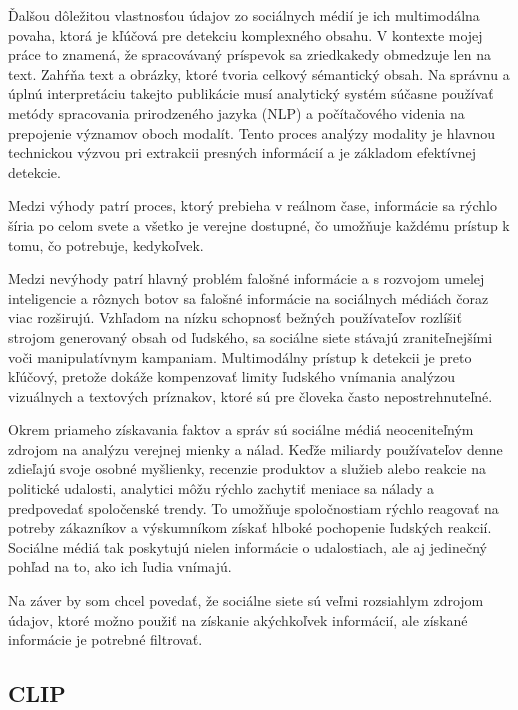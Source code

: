 \documentclass[]{tukediphc}
\begin{document}
Ďalšou dôležitou vlastnosťou údajov zo sociálnych médií je ich multimodálna povaha, ktorá je kľúčová pre detekciu komplexného obsahu. V kontexte mojej práce to znamená, že spracovávaný príspevok sa zriedkakedy obmedzuje len na text. Zahŕňa text a obrázky, ktoré tvoria celkový sémantický obsah. Na správnu a úplnú interpretáciu takejto publikácie musí analytický systém súčasne používať metódy spracovania prirodzeného jazyka (NLP) a počítačového videnia na prepojenie významov oboch modalít. Tento proces analýzy modality je hlavnou technickou výzvou pri extrakcii presných informácií a je základom efektívnej detekcie.

Medzi výhody patrí proces, ktorý prebieha v reálnom čase, informácie sa rýchlo šíria po celom svete a všetko je verejne dostupné, čo umožňuje každému prístup k tomu, čo potrebuje, kedykoľvek.

Medzi nevýhody patrí hlavný problém falošné informácie a s rozvojom umelej inteligencie a rôznych botov sa falošné informácie na sociálnych médiách čoraz viac rozširujú. Vzhľadom na nízku schopnosť bežných používateľov rozlíšiť strojom generovaný obsah od ľudského, sa sociálne siete stávajú zraniteľnejšími voči manipulatívnym kampaniam. Multimodálny prístup k detekcii je preto kľúčový, pretože dokáže kompenzovať limity ľudského vnímania analýzou vizuálnych a textových príznakov, ktoré sú pre človeka často nepostrehnuteľné\cite{Detecting_Artificial_Intelligence_Generated_Text_from_Human-Written_Text}.

Okrem priameho získavania faktov a správ sú sociálne médiá neoceniteľným zdrojom na analýzu verejnej mienky a nálad. Keďže miliardy používateľov denne zdieľajú svoje osobné myšlienky, recenzie produktov a služieb alebo reakcie na politické udalosti, analytici môžu rýchlo zachytiť meniace sa nálady a predpovedať spoločenské trendy. To umožňuje spoločnostiam rýchlo reagovať na potreby zákazníkov a výskumníkom získať hlboké pochopenie ľudských reakcií. Sociálne médiá tak poskytujú nielen informácie o udalostiach, ale aj jedinečný pohľad na to, ako ich ľudia vnímajú.

Na záver by som chcel povedať, že sociálne siete sú veľmi rozsiahlym zdrojom údajov, ktoré možno použiť na získanie akýchkoľvek informácií, ale získané informácie je potrebné filtrovať.


\subsection{CLIP}
\end{document}
